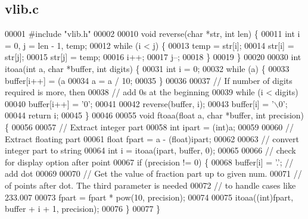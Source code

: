 \subsection{vlib.\+c}
\label{a00149_source}

\begin{DoxyCode}
00001 \textcolor{preprocessor}{#include "vlib.h"}
00002 
00010 \textcolor{keywordtype}{void} reverse(\textcolor{keywordtype}{char} *str, \textcolor{keywordtype}{int} len) \{
00011   \textcolor{keywordtype}{int} i = 0, j = len - 1, temp;
00012   \textcolor{keywordflow}{while} (i < j) \{
00013     temp = str[i];
00014     str[i] = str[j];
00015     str[j] = temp;
00016     i++;
00017     j--;
00018   \}
00019 \}
00020 
00030 \textcolor{keywordtype}{int} itoaa(\textcolor{keywordtype}{int} a, \textcolor{keywordtype}{char} *buffer, \textcolor{keywordtype}{int} digits) \{
00031   \textcolor{keywordtype}{int} i = 0;
00032   \textcolor{keywordflow}{while} (a) \{
00033     buffer[i++] = (a %
00034     a = a / 10;
00035   \}
00036 
00037   \textcolor{comment}{// If number of digits required is more, then}
00038   \textcolor{comment}{// add 0s at the beginning}
00039   \textcolor{keywordflow}{while} (i < digits)
00040     buffer[i++] = \textcolor{charliteral}{'0'};
00041 
00042   reverse(buffer, i);
00043   buffer[i] = \textcolor{charliteral}{'\(\backslash\)0'};
00044   \textcolor{keywordflow}{return} i;
00045 \}
00046 
00055 \textcolor{keywordtype}{void} ftoaa(\textcolor{keywordtype}{float} a, \textcolor{keywordtype}{char} *buffer, \textcolor{keywordtype}{int} precision) \{
00056 
00057   \textcolor{comment}{// Extract integer part}
00058   \textcolor{keywordtype}{int} ipart = (int)a;
00059 
00060   \textcolor{comment}{// Extract floating part}
00061   \textcolor{keywordtype}{float} fpart = a - (float)ipart;
00062 
00063   \textcolor{comment}{// convert integer part to string}
00064   \textcolor{keywordtype}{int} i = itoaa(ipart, buffer, 0);
00065 
00066   \textcolor{comment}{// check for display option after point}
00067   \textcolor{keywordflow}{if} (precision != 0) \{
00068     buffer[i] = \textcolor{charliteral}{'.'}; \textcolor{comment}{// add dot}
00069 
00070     \textcolor{comment}{// Get the value of fraction part up to given num.}
00071     \textcolor{comment}{// of points after dot. The third parameter is needed}
00072     \textcolor{comment}{// to handle cases like 233.007}
00073     fpart = fpart * pow(10, precision);
00074 
00075     itoaa((\textcolor{keywordtype}{int})fpart, buffer + i + 1, precision);
00076   \}
00077 \}
\end{DoxyCode}
